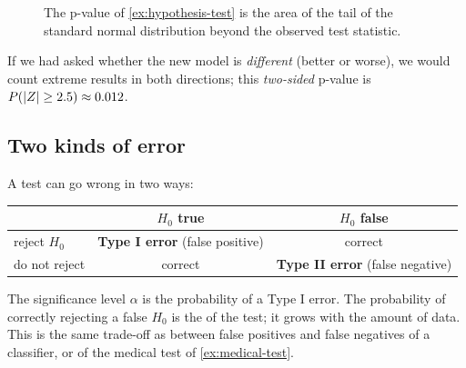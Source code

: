 \begin{figure}[htbp]
\centering
{}
\caption{The p-value of \cref{ex:hypothesis-test} is the area of the tail of the
  standard normal distribution beyond the observed test statistic.}
\label{fig:p-value}
\end{figure}

If we had asked whether the new model is \emph{different} (better or worse), we
would count extreme results in both directions; this \emph{two-sided} p-value is
$P(\lvert Z\rvert \ge 2.5) \approx 0.012$.

\subsection{Two kinds of error}

A test can go wrong in two ways:
\begin{center}
\begin{tabular}{lcc}
\toprule
 & $H_0$ true & $H_0$ false\\
\midrule
reject $H_0$ & \textbf{Type I error} (false positive) & correct\\
do not reject & correct & \textbf{Type II error} (false negative)\\
\bottomrule
\end{tabular}
\end{center}
The significance level $\alpha$ is the probability of a Type I error. The
probability of correctly rejecting a false $H_0$ is the  of the test;
it grows with the amount of data. This is the same trade-off as between false
positives and false negatives of a classifier, or of the medical test of
\cref{ex:medical-test}.

